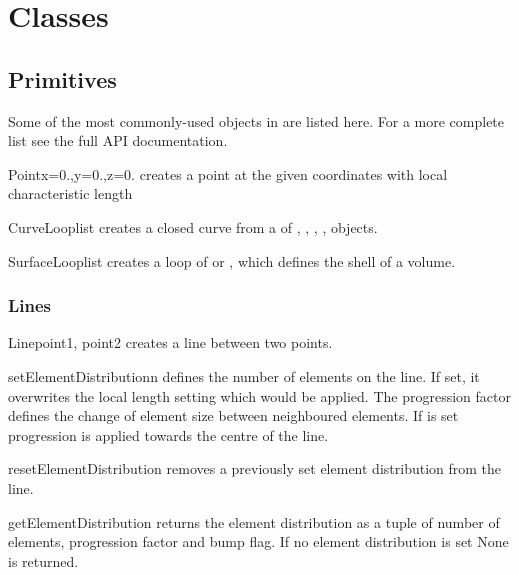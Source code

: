 \section{\pycad Classes}

\subsection{Primitives}
Some of the most commonly-used objects in \pycad are listed here.
For a more complete list see the full API documentation.

\begin{classdesc}{Point}{x=0.,y=0.,z=0.}
creates a point at the given coordinates with local characteristic length 
\end{classdesc}

\begin{classdesc}{CurveLoop}{list}
creates a closed curve from a  of
, , , ,
 objects.
\end{classdesc}

\begin{classdesc}{SurfaceLoop}{list}
creates a loop of  or , which defines
the shell of a volume.
\end{classdesc}

\subsubsection{Lines}
\begin{classdesc}{Line}{point1, point2}
creates a line between two points.
\end{classdesc}

\begin{methoddesc}[Line]{setElementDistribution}{n}
defines the number of elements on the line. If set, it overwrites the local
length setting which would be applied.
The progression factor  defines the change of element size
between neighboured elements. If  is set progression is
applied towards the centre of the line.
\end{methoddesc}

\begin{methoddesc}[Line]{resetElementDistribution}{}
removes a previously set element distribution from the line.
\end{methoddesc}
\begin{methoddesc}[Line]{getElementDistribution}{}
returns the element distribution as a tuple of number of elements, progression
factor and bump flag. If no element distribution is set None is returned.
\end{methoddesc}

